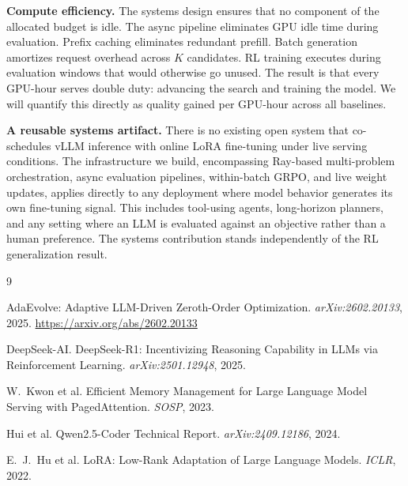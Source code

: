 \documentclass{article}
\begin{document}
\textbf{Compute efficiency.} The systems design ensures that no component
of the allocated budget is idle. The async pipeline eliminates GPU idle
time during evaluation. Prefix caching eliminates redundant prefill. Batch
generation amortizes request overhead across $K$ candidates. RL training
executes during evaluation windows that would otherwise go unused. The
result is that every GPU-hour serves double duty: advancing the search and
training the model. We will quantify this directly as quality gained per
GPU-hour across all baselines.

\textbf{A reusable systems artifact.} There is no existing open system that
co-schedules vLLM inference with online LoRA fine-tuning under live serving
conditions. The infrastructure we build, encompassing Ray-based
multi-problem orchestration, async evaluation pipelines, within-batch GRPO,
and live weight updates, applies directly to any deployment where model
behavior generates its own fine-tuning signal. This includes tool-using
agents, long-horizon planners, and any setting where an LLM is evaluated
against an objective rather than a human preference. The systems
contribution stands independently of the RL generalization result.


\begin{thebibliography}{9}

AdaEvolve: Adaptive LLM-Driven Zeroth-Order Optimization.
\textit{arXiv:2602.20133}, 2025.
\url{https://arxiv.org/abs/2602.20133}

DeepSeek-AI.
DeepSeek-R1: Incentivizing Reasoning Capability in LLMs via Reinforcement
Learning.
\textit{arXiv:2501.12948}, 2025.

W.~Kwon et al.
Efficient Memory Management for Large Language Model Serving with
PagedAttention.
\textit{SOSP}, 2023.

Hui et al.
Qwen2.5-Coder Technical Report.
\textit{arXiv:2409.12186}, 2024.

E.~J.~Hu et al.
LoRA: Low-Rank Adaptation of Large Language Models.
\textit{ICLR}, 2022.

\end{thebibliography}
\end{document}
